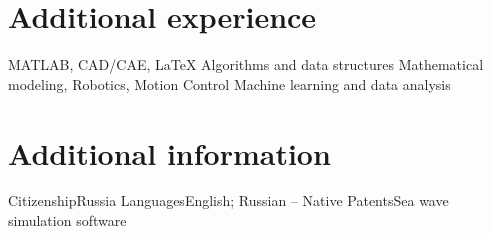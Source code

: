 \documentclass[11pt,a4paper]{moderncv}
\begin{document}
\section{Additional experience}
\cvline
    {}
    {MATLAB, CAD/CAE, \LaTeX}
\cvline
    {}
    {Algorithms and data structures}
\cvline
    {}
    {Mathematical modeling, Robotics, Motion Control}
\cvline
    {}
    {Machine learning and data analysis}

\section{Additional information}
\cvline
    {Citizenship}{Russia}
\cvline
    {Languages}{English; Russian -- Native}
\cvline
    {Patents}{Sea wave simulation software}
\end{document}
